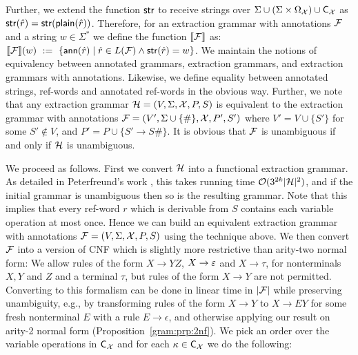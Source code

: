 Further, we extend the function $\mathsf{str}$ to receive strings over $\Sigma \cup (\Sigma\times\Omega_{\mathcal{X}}) \cup \textsf{C}_{\mathcal{X}}$ as $\mathsf{str}(\hat{r}) = \mathsf{str}(\textsf{plain}(\hat{r}))$. Therefore, for an extraction grammar with annotations $\mathcal{F}$ and a string $w\in\Sigma^*$ we define the function ${\llbracket{\mathcal{F}}\rrbracket}$ as: ${\llbracket{\mathcal{F}}\rrbracket}(w) \ := \  \{\textsf{ann}(\hat{r}) \mid \hat{r} \in L(\mathcal{F}) \wedge \mathsf{str}(\hat{r}) = w\}$.
We maintain the notions of equivalency between annotated grammars, extraction grammars, and extraction grammars with annotations. Likewise, we define equality between annotated strings, ref-words and  annotated ref-words in the obvious way. Further, we note that any extraction grammar $\mathcal{H} = (V, \Sigma, \mathcal{X}, P, S)$ is equivalent to the extraction grammar with annotations $\mathcal{F} = (V', \Sigma\cup\{\#\}, \mathcal{X}, P', S')$ where $V' = V\cup\{S'\}$ for some $S'\not\in V$, and $P' = P \cup\{S'\to S\# \}$. It is obvious that $\mathcal{F}$ is unambiguous if and only if $\mathcal{H}$ is unambiguous.

We proceed as follows. First we convert $\mathcal{H}$ into a functional extraction grammar.
As detailed in Peterfreund's work
\cite[Propositions 10 and 12]{Peterfreund21}, this takes running time 
$\mathcal{O}(3^{2k}|\mathcal{H}|^2)$, and if the initial grammar is unambiguous then so is
the resulting grammar.
Note that this implies that every ref-word $r$ which is derivable from $S$ contains each variable operation at most once. Hence we can build an equivalent extraction grammar with annotations $\mathcal{F} = (V, \Sigma, \mathcal{X}, P, S)$ using the technique above. We then convert $\mathcal{F}$ into a version of CNF which is slightly more restrictive than arity-two normal form: We allow rules of the form $X\to YZ$, $X\to \varepsilon$ and $X\to \tau$, for nonterminals $X, Y$ and $Z$ and a terminal $\tau$, but rules of the form $X\to Y$ are not permitted.
Converting to this formalism can be done in linear time in $|\mathcal{F}|$ while preserving unambiguity,
%
e.g., by transforming rules of the form $X \rightarrow Y$ to $X \rightarrow E Y$
for some fresh nonterminal $E$ with a rule $E \rightarrow \epsilon$, and
otherwise applying our result on arity-2 normal form (Proposition~\ref{gram:prp:2nf}).
We pick an order over the variable operations in $\textsf{C}_{\mathcal{X}}$ and for each $\kappa\in\textsf{C}_{\mathcal{X}}$ we do the following:

